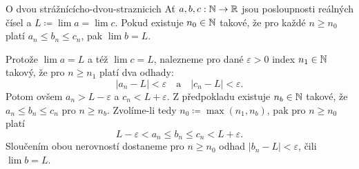 \begin{lemma}{O dvou strážnících}{o-dvou-straznicich}
 Ať $a,b,c:\mathbb{N} \to \mathbb{R}$ jsou posloupnosti reálných čísel a $L \coloneqq \lim a =
 \lim c$. Pokud existuje $n_0 \in \mathbb{N}$ takové, že pro každé $n \geq n_0$ platí
 $a_n \leq b_n \leq c_n$, pak $\lim b = L$.
\end{lemma}
\begin{lemproof}
 Protože $\lim a = L$ a též $\lim c = L$, nalezneme pro dané $\varepsilon>0$
 index $n_1 \in \mathbb{N}$ takový, že pro $n \geq n_1$ platí dva odhady:
 \[
  |a_n - L| < \varepsilon \quad \text{a} \quad |c_n - L| < \varepsilon.
 \]
 Potom ovšem $a_n > L - \varepsilon$ a $c_n < L + \varepsilon$. Z předpokladu
 existuje $n_b \in \mathbb{N}$ takové, že $a_n \leq b_n \leq c_n$ pro $n \geq n_b$.
 Zvolíme-li tedy $n_0 \coloneqq \max(n_1,n_b)$, pak pro $n \geq n_0$ platí
 \[
  L - \varepsilon < a_n \leq b_n \leq c_n < L + \varepsilon.
 \]
 Sloučením obou nerovností dostaneme pro $n \geq n_0$ odhad $|b_n -
 L|<\varepsilon$, čili $\lim b = L$.
\end{lemproof}


